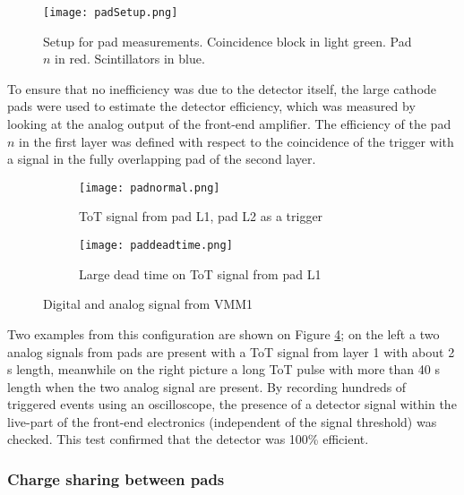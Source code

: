 \begin{figure}[ht]
\centering
\texttt{[image: padSetup.png]}
\caption{Setup for pad measurements. Coincidence block in  light green. Pad $n$ in red. Scintillators in blue.}\label{padsetup}
\end{figure}


To ensure that no inefficiency was due to the detector itself, the large cathode pads were used to estimate the detector
efficiency, which was measured by looking at the analog output of the front-end amplifier. The efficiency of the pad $n$
in the first layer was defined with respect to the coincidence of the trigger with a signal in the fully overlapping pad
of the second layer. \par



\begin{figure}[t]
\centering
\hspace*{\fill}
\begin{subfigure}[b]{0.45\textwidth}
\centering
\texttt{[image: padnormal.png]}
\caption{ToT signal from pad L1, pad L2 as a trigger}\label{scope1}
\end{subfigure}
\hfill
\begin{subfigure}[b]{0.45\textwidth}
\centering
\texttt{[image: paddeadtime.png]}
\caption{Large dead time on ToT signal from pad L1}\label{scope2}
\end{subfigure}
\hspace*{\fill}
\caption{Digital and analog signal from VMM1}\label{scope}
\end{figure}

Two examples from this configuration are shown on Figure \ref{scope}; on the left a two analog signals from pads are
present with a ToT signal from layer 1 with about 2 \micro s length, meanwhile on the right picture a long ToT pulse
with more than 40 \micro s length when the two analog signal are present. By recording hundreds of triggered events
using an oscilloscope, the presence of a detector signal within the live-part of the front-end electronics (independent
of the signal threshold) was checked. This test confirmed that the detector was 100\% efficient.\par


\subsubsection{Charge sharing between pads}

